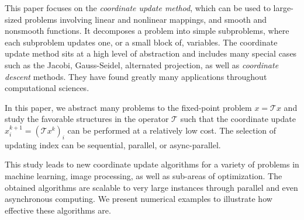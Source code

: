 This paper focuses on the \emph{coordinate update method}, which can be used to large-sized problems involving linear and nonlinear mappings, and smooth and nonsmooth functions. It decomposes a problem into simple subproblems, where each subproblem updates one, or a small block of, variables. The coordinate update method sits at a high level of abstraction and includes many special cases such as the Jacobi, Gauss-Seidel, alternated projection, as well as \emph{coordinate descent} methods. They have found greatly many applications throughout computational sciences.

In this paper, we abstract many problems to the fixed-point problem $x=\mathcal{T} x$ and study the favorable structures in the operator $\mathcal{T}$ such that the coordinate update $x_i^{k+1} = (\mathcal{T} x^k)_i$ can be performed at a relatively low cost. The selection of updating index can be sequential, parallel, or async-parallel. 

This study leads to new coordinate update algorithms for a variety of problems in machine learning, image processing, as well as sub-areas of optimization. The obtained algorithms are scalable to very large instances through parallel and even asynchronous computing. We present numerical examples to illustrate how effective these algorithms are.


